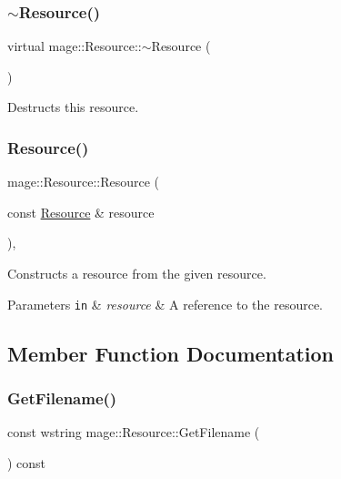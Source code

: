 \subsubsection{\texorpdfstring{$\sim$\+Resource()}{~Resource()}}
{\footnotesize\ttfamily virtual mage\+::\+Resource\+::$\sim$\+Resource (\begin{DoxyParamCaption}{ }\end{DoxyParamCaption})\hspace{0.3cm}{\ttfamily [virtual]}}

Destructs this resource. \hypertarget{classmage_1_1_resource_a4ee2dba2675546b603e03a69a2f2db52}{}\label{classmage_1_1_resource_a4ee2dba2675546b603e03a69a2f2db52} 
\subsubsection{\texorpdfstring{Resource()}{Resource()}\hspace{0.1cm}{\footnotesize\ttfamily [2/2]}}
{\footnotesize\ttfamily mage\+::\+Resource\+::\+Resource (\begin{DoxyParamCaption}\item[{const \hyperlink{classmage_1_1_resource}{Resource} \&}]{resource }\end{DoxyParamCaption})\hspace{0.3cm}{\ttfamily [private]}, {\ttfamily [delete]}}

Constructs a resource from the given resource.


\begin{DoxyParams}[1]{Parameters}
\mbox{\tt in}  & {\em resource} & A reference to the resource. \\
\hline
\end{DoxyParams}


\subsection{Member Function Documentation}
\hypertarget{classmage_1_1_resource_a1f05385b8c05646989689fc04847a816}{}\label{classmage_1_1_resource_a1f05385b8c05646989689fc04847a816} 
\subsubsection{\texorpdfstring{Get\+Filename()}{GetFilename()}}
{\footnotesize\ttfamily const wstring mage\+::\+Resource\+::\+Get\+Filename (\begin{DoxyParamCaption}{ }\end{DoxyParamCaption}) const}

